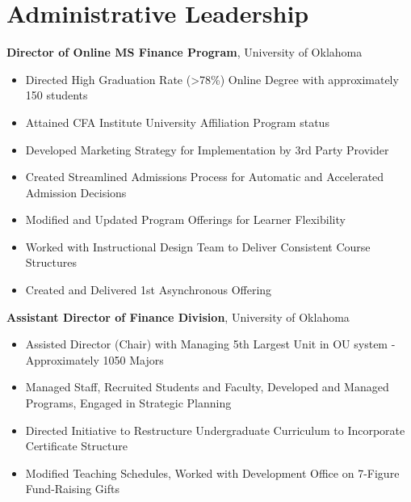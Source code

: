\documentclass[11pt,a4paper,]{awesome-cv}
\begin{document}
\makecvheader





\section{Administrative Leadership}\label{administrative-leadership}

\textbf{Director of Online MS Finance Program}, University of Oklahoma

\begin{itemize}
\item Directed High Graduation Rate (>78\%) Online Degree with approximately 150 students
\item Attained CFA Institute University Affiliation Program status
\item Developed Marketing Strategy for Implementation by 3rd Party Provider
\item Created Streamlined Admissions Process for Automatic and Accelerated Admission Decisions
\item Modified and Updated Program Offerings for Learner Flexibility
\item Worked with Instructional Design Team to Deliver Consistent Course Structures
\item Created and Delivered 1st Asynchronous Offering
\end{itemize}

\textbf{Assistant Director of Finance Division}, University of Oklahoma

\begin{itemize}
\item Assisted Director (Chair) with Managing 5th Largest Unit in OU system - Approximately 1050 Majors
\item Managed Staff, Recruited Students and Faculty, Developed and Managed Programs, Engaged in Strategic Planning
\item Directed Initiative to Restructure Undergraduate Curriculum to Incorporate Certificate Structure
\item Modified Teaching Schedules, Worked with Development Office on 7-Figure Fund-Raising Gifts
\end{itemize}
\end{document}
